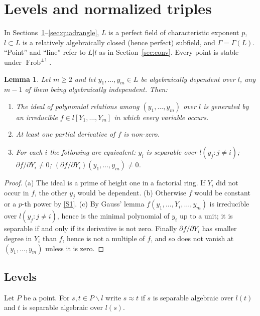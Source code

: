 \documentclass[11pt]{amsart}
\newtheorem{lemma}[theorem]{Lemma}
\theoremstyle{definition}
\theoremstyle{remark}
\newcommand{\Frob}{\operatorname{Frob}}
\newcommand{\sm}{\smallsetminus}
\begin{document}
\section{Levels and normalized triples}\label{sec:levels}

In Sections~\ref{sec:levels}--\ref{sec:quadrangle}, $L$ is a perfect field of characteristic exponent $p$, $l\subset L$ is a relatively algebraically closed
(hence perfect) subfield, and $\Gamma=\Gamma(L)$. ``Point'' and ``line'' refer to $L|l$ as in Section~\ref{sec:conv}. Every point is stable under $\Frob^{\pm1}$.

\begin{lemma}\label{lem:sepcrit}
Let $m\ge2$ and let $y_1,\dots,y_m\in L$ be algebraically dependent over $l$, any $m-1$ of them being algebraically independent. Then:
\begin{enumerate}[label=\textup{(\alph*)}]
\item The ideal of polynomial relations among $(y_1,\dots,y_m)$ over $l$ is generated by an irreducible $f\in l[Y_1,\dots,Y_m]$ in which every variable occurs.
\item At least one partial derivative of $f$ is non-zero.
\item For each $i$ the following are equivalent: $y_i$ is separable over $l(y_j : j\ne i)$; $\partial f/\partial Y_i\neq0$; $(\partial f/\partial Y_i)(y_1,\dots,y_m)\ne0$.
\end{enumerate}
\end{lemma}

\begin{proof}
(a) The ideal is a prime of height one in a factorial ring. If $Y_i$ did not occur in $f$, the other $y_j$ would be dependent.
(b) Otherwise $f$ would be constant or a $p$-th power by \ref{S1}.
(c) By Gauss' lemma $f(y_1,\dots,Y_i,\dots,y_m)$ is irreducible over $l(y_j:j\neq i)$, hence is the minimal polynomial of $y_i$ up to a unit; it is separable
if and only if its derivative is not zero. Finally $\partial f/\partial Y_i$ has smaller degree in $Y_i$ than $f$, hence is not a multiple of $f$, and so does not
vanish at $(y_1,\dots,y_m)$ unless it is zero.
\end{proof}

\subsection{Levels}
Let $P$ be a point. For $s,t\in P\sm l$ write $s\approx t$ if $s$ is separable algebraic over $l(t)$ and $t$ is separable algebraic over $l(s)$.
\end{document}
